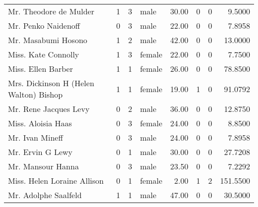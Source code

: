 \begin{tabular}{lrrlrrrr}
Mr. Theodore de Mulder                             &         1 &       3 &    male &  30.00 &                        0 &                        0 &    9.5000 \\
Mr. Penko Naidenoff                                &         0 &       3 &    male &  22.00 &                        0 &                        0 &    7.8958 \\
Mr. Masabumi Hosono                                &         1 &       2 &    male &  42.00 &                        0 &                        0 &   13.0000 \\
Miss. Kate Connolly                                &         1 &       3 &  female &  22.00 &                        0 &                        0 &    7.7500 \\
Miss. Ellen Barber                                 &         1 &       1 &  female &  26.00 &                        0 &                        0 &   78.8500 \\
Mrs. Dickinson H (Helen Walton) Bishop             &         1 &       1 &  female &  19.00 &                        1 &                        0 &   91.0792 \\
Mr. Rene Jacques Levy                              &         0 &       2 &    male &  36.00 &                        0 &                        0 &   12.8750 \\
Miss. Aloisia Haas                                 &         0 &       3 &  female &  24.00 &                        0 &                        0 &    8.8500 \\
Mr. Ivan Mineff                                    &         0 &       3 &    male &  24.00 &                        0 &                        0 &    7.8958 \\
Mr. Ervin G Lewy                                   &         0 &       1 &    male &  30.00 &                        0 &                        0 &   27.7208 \\
Mr. Mansour Hanna                                  &         0 &       3 &    male &  23.50 &                        0 &                        0 &    7.2292 \\
Miss. Helen Loraine Allison                        &         0 &       1 &  female &   2.00 &                        1 &                        2 &  151.5500 \\
Mr. Adolphe Saalfeld                               &         1 &       1 &    male &  47.00 &                        0 &                        0 &   30.5000 \\

\end{tabular}
